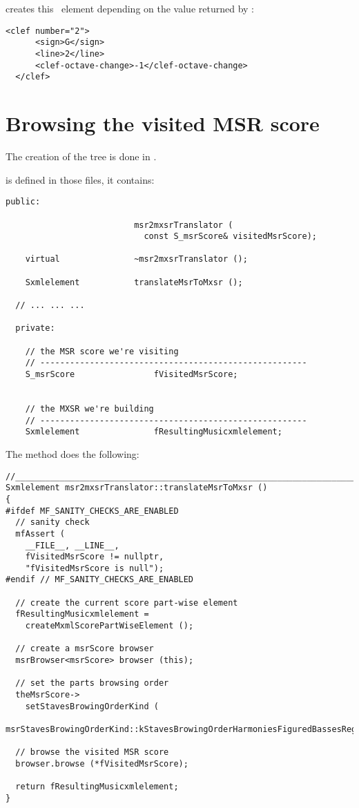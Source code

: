 creates this \mxml\ element depending on the value returned by :
\begin{lstlisting}[language=MusicXML]
 <clef number="2">
      <sign>G</sign>
      <line>2</line>
      <clef-octave-change>-1</clef-octave-change>
  </clef>

\end{lstlisting}

\section{Browsing the visited MSR score}

The creation of the tree is done in .

 is defined in those files, it contains:
\begin{lstlisting}[language=CPlusPlus]
  public:

                          msr2mxsrTranslator (
                            const S_msrScore& visitedMsrScore);

    virtual               ~msr2mxsrTranslator ();

    Sxmlelement           translateMsrToMxsr ();

  // ... ... ...

  private:

    // the MSR score we're visiting
    // ------------------------------------------------------
    S_msrScore                fVisitedMsrScore;


    // the MXSR we're building
    // ------------------------------------------------------
    Sxmlelement               fResultingMusicxmlelement;
\end{lstlisting}

The  method does the following:
\begin{lstlisting}[language=CPlusPlus]
//________________________________________________________________________
Sxmlelement msr2mxsrTranslator::translateMsrToMxsr ()
{
#ifdef MF_SANITY_CHECKS_ARE_ENABLED
  // sanity check
  mfAssert (
    __FILE__, __LINE__,
    fVisitedMsrScore != nullptr,
    "fVisitedMsrScore is null");
#endif // MF_SANITY_CHECKS_ARE_ENABLED

  // create the current score part-wise element
  fResultingMusicxmlelement =
    createMxmlScorePartWiseElement ();

  // create a msrScore browser
  msrBrowser<msrScore> browser (this);

  // set the parts browsing order
  theMsrScore->
    setStavesBrowingOrderKind (
      msrStavesBrowingOrderKind::kStavesBrowingOrderHarmoniesFiguredBassesRegulars);

  // browse the visited MSR score
  browser.browse (*fVisitedMsrScore);

  return fResultingMusicxmlelement;
}
\end{lstlisting}


